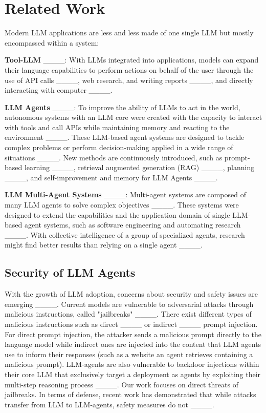 \section{Related Work}
Modern LLM applications are less and less made of one single LLM but mostly encompassed within a system:

\textbf{Tool-LLM} ____: With LLMs integrated into applications, models can expand their language capabilities to perform actions on behalf of the user through the use of API calls ____, web research, and writing reports ____, and directly interacting with computer ____.

\textbf{LLM Agents} ____: To improve the ability of LLMs to act in the world, autonomous systems with an LLM core were created with the capacity to interact with tools and call APIs while maintaining memory and reacting to the environment ____. These LLM-based agent systems are designed to tackle complex problems or perform decision-making applied in a wide range of situations ____. New methods are continuously introduced, such as prompt-based learning ____, retrieval augmented generation (RAG) ____, planning ____, and self-improvement and memory for LLM Agents ____.

\textbf{LLM Multi-Agent Systems} ____: Multi-agent systems are composed of many LLM agents to solve complex objectives ____. These systems were designed to extend the capabilities and the application domain of single LLM-based agent systems, such as software engineering and automating research ____. With collective intelligence of a group of specialized agents, research might find better results than relying on a single agent ____.

\subsection{Security of LLM Agents}
With the growth of LLM adoption, concerns about security and safety issues are emerging ____.
Current models are vulnerable to adversarial attacks through malicious instructions, called "jailbreaks" ____. There exist different types of malicious instructions such as direct ____ or indirect ____ prompt injection. For direct prompt injection, the attacker sends a malicious prompt directly to the language model while indirect ones are injected into the content that LLM agents use to inform their responses (such as a website an agent retrieves containing a malicious prompt). LLM-agents are also vulnerable to backdoor injections within their core LLM that exclusively target a deployment as agents by exploiting their multi-step reasoning process ____. Our work focuses on direct threats of jailbreaks.
In terms of defense, recent work has demonstrated that while attacks transfer from LLM to LLM-agents, safety measures do not ____.  

